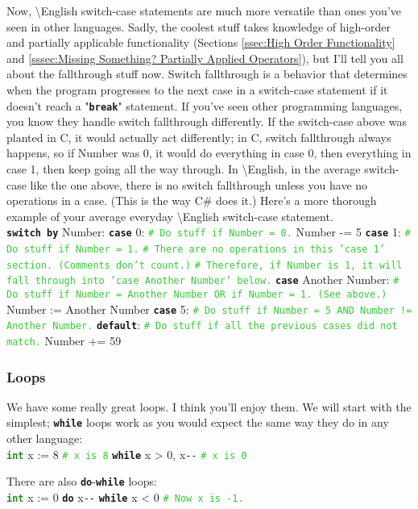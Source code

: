 \documentclass{article}
\newcommand{\English}{\textbackslash{}English}				%
\newcommand{\sssecl}[1]{\subsubsection{#1}\label{sssec:#1}}
\newcommand{\codecomment}[1]{\texttt{\textcolor{LimeGreen}{#1}}}
\newcommand{\commentline}[1]{\codecomment{\# #1}}
\newcommand{\type}[1]{\texttt{\textcolor{ForestGreen}{\textbf{#1}}}}
\newcommand{\common}[1]{\texttt{\textcolor{Mulberry}{\textbf{#1}}}}
\newenvironment{code}[0]
{\ttfamily{}				%
\setlength\parindent{0cm}	%
~\\}
{\setlength\parindent{1cm}
~\\}
\begin{document}
\indent Now, \English{} switch-case statements are much more versatile than ones you've seen in other languages. Sadly, the coolest stuff takes knowledge of high-order and partially applicable functionality (Sections \ref{ssec:High Order Functionality} and \ref{sssec:Missing Something? Partially Applied Operators}), but I'll tell you all about the fallthrough stuff now.
\indent Switch fallthrough is a behavior that determines when the program progresses to the next case in a switch-case statement if it doesn't reach a "\common{break}" statement. If you've seen other programming languages, you know they handle switch fallthrough differently. If the switch-case above was planted in C, it would actually act differently; in C, switch fallthrough always happens, so if Number was 0, it would do everything in case 0, then everything in case 1, then keep going all the way through. In \English{}, in the average switch-case like the one above, there is no switch fallthrough unless you have no operations in a case. (This is the way C\# does it.) Here's a more thorough example of your average everyday \English{} switch-case statement.
\begin{code}
\common{switch by} Number:
\common{case} 0:
\qquad\commentline{Do stuff if Number = 0.}
\qquad{}Number -= 5
\common{case} 1:
\qquad\commentline{Do stuff if Number = 1.}
\qquad\commentline{There are no operations in this 'case 1' section. (Comments don't count.)}
\qquad\commentline{Therefore, if Number is 1, it will fall through into 'case Another Number' below.}
\common{case} Another Number:
\qquad\commentline{Do stuff if Number = Another Number OR if Number = 1. (See above.)}
\qquad{}Number := Another Number
\common{case} 5:
\qquad\commentline{Do stuff if Number = 5 AND Number != Another Number.}
\common{default}:
\qquad\commentline{Do stuff if all the previous cases did not match.}
\qquad{}Number += 59
\end{code}
\sssecl{Loops}
\indent We have some really great loops. I think you'll enjoy them.
\indent We will start with the simplest; \common{while} loops work as you would expect the same way they do in any other language:
\begin{code}
\type{int} x := 8 \commentline{x is 8}
\common{while} x > 0,
\qquad{}x\verb+--+
\commentline{x is 0}
\end{code}

\indent There are also \common{do}-\common{while} loops:
\begin{code}
\type{int} x := 0
\common{do}
\qquad{}x\verb+--+
\common{while} x < 0
\commentline{Now x is -1.}
\end{code}
\end{document}
